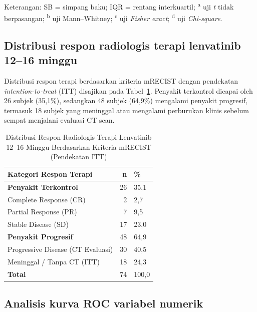 \documentclass[
  indonesian,
]{report}
\begin{document}
Keterangan: SB = simpang baku; IQR = rentang interkuartil;
\textsuperscript{a} uji \emph{t} tidak berpasangan; \textsuperscript{b}
uji Mann--Whitney; \textsuperscript{c} uji \emph{Fisher exact};
\textsuperscript{d} uji \emph{Chi-square}.

\subsection{Distribusi respon radiologis terapi lenvatinib 12--16
minggu}\label{distribusi-respon-radiologis-terapi-lenvatinib-1216-minggu}

Distribusi respon terapi berdasarkan kriteria mRECIST dengan pendekatan
\emph{intention-to-treat} (ITT) disajikan pada Tabel~\ref{tbl-respon}.
Penyakit terkontrol dicapai oleh 26 subjek (35,1\%), sedangkan 48 subjek
(64,9\%) mengalami penyakit progresif, termasuk 18 subjek yang meninggal
atau mengalami perburukan klinis sebelum sempat menjalani evaluasi CT
scan.

{

\begin{longtable}[]{@{}lrl@{}}

\caption{\label{tbl-respon}Distribusi Respon Radiologis Terapi
Lenvatinib 12--16 Minggu Berdasarkan Kriteria mRECIST (Pendekatan ITT)}

\tabularnewline

\toprule\noalign{}
Kategori Respon Terapi & n & \% \\
\midrule\noalign{}
\endhead
\bottomrule\noalign{}
\endlastfoot
\textbf{Penyakit Terkontrol} & 26 & 35,1 \\
Complete Response (CR) & 2 & 2,7 \\
Partial Response (PR) & 7 & 9,5 \\
Stable Disease (SD) & 17 & 23,0 \\
\textbf{Penyakit Progresif} & 48 & 64,9 \\
Progressive Disease (CT Evaluasi) & 30 & 40,5 \\
Meninggal / Tanpa CT (ITT) & 18 & 24,3 \\
\textbf{Total} & 74 & 100,0 \\

\end{longtable}

}

\subsection{Analisis kurva ROC variabel
numerik}\label{analisis-kurva-roc-variabel-numerik}
\end{document}
